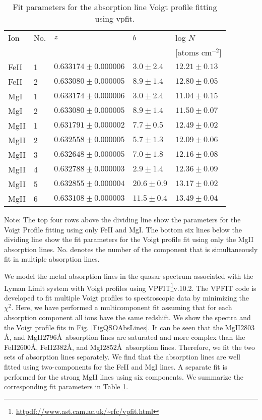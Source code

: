 \documentclass[a4paper,fleqn,usenatbib]{mnras}
\begin{document}
{\begin{table}
\begin{minipage}{\linewidth}
\centering
\caption{Fit parameters for the absorption line Voigt profile fitting using {\sc vpfit}.}
\label{TabAbsFitParam}
\begin{tabular}{l l l l l}
\hline
Ion & No. & $z$ & $b$ & log $N$ \\
& & & & [atoms cm$^{-2}$]\\
\hline
FeII & 1 & $0.633174 \pm 0.000006$ & $3.0 \pm 2.4$ & $12.21 \pm 0.13$\\
FeII & 2 & $0.633080 \pm 0.000005$ & $8.9 \pm 1.4$ & $12.80 \pm 0.05$\\
MgI & 1 & $0.633174 \pm 0.000006$ & $3.0 \pm 2.4$ & $11.04 \pm 0.15$\\
MgI & 2 & $0.633080 \pm 0.000005$ & $8.9 \pm 1.4$ & $11.50 \pm 0.07$\\
\hline
MgII & 1 & $0.631791 \pm 0.000002$ & $7.7 \pm 0.5$ & $12.49 \pm 0.02$\\
MgII & 2 & $0.632558 \pm 0.000005$ & $5.7 \pm 1.3$ & $12.09 \pm 0.06$\\
MgII & 3 & $0.632648 \pm 0.000005$ & $7.0 \pm 1.8$ & $12.16 \pm 0.08$\\
MgII & 4 & $0.632788 \pm 0.000003$ & $2.9 \pm 1.4$ & $12.36 \pm 0.09$\\
MgII & 5 & $0.632855 \pm 0.000004$ & $20.6 \pm 0.9$ & $13.17 \pm 0.02$\\
MgII & 6 & $0.633108 \pm 0.000003$ & $11.5 \pm 0.4$ & $13.49 \pm 0.04$\\ 
\hline
\end{tabular}
\end{minipage}
\begin{minipage}{\linewidth}
Note: The top four rows above the dividing line show the parameters for the Voigt Profile fitting using only FeII and MgI. The bottom six lines below the dividing line show the fit parameters for the Voigt profile fit using only the MgII absorption lines. No. denotes the number of the component that is simultaneously fit in multiple absorption lines.
\end{minipage}
\end{table}

We model the metal absorption lines in the quasar spectrum associated with the Lyman Limit system with Voigt profiles using {\sc VPFIT}\footnote{\url{httpdf://www.ast.cam.ac.uk/~rfc/vpfit.html}}v.10.2. The {\sc VPFIT} code is developed to fit multiple Voigt profiles to spectroscopic data by minimizing the $\chi^2$. Here, we have performed a multicomponent fit assuming that for each absorption component all ions have the same redshift. We show the spectra and the Voigt profile fits in Fig. \ref{FigQSOAbsLines}. It can be seen that the MgII$2803$\AA, and MgII$2796$\AA\ absorption lines are saturated and more complex than the FeII$2600$\AA, FeII$2382$\AA, and MgI$2852$\AA\ absorption lines. Therefore, we fit the two sets of absorption lines separately. We find that the absorption lines are well fitted using two-components for the FeII and MgI lines. A separate fit is performed for the strong MgII lines using six components. We summarize the corresponding fit parameters in Table \ref{TabAbsFitParam}.



}
\end{document}
